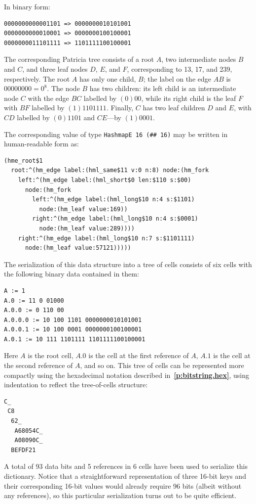 \documentclass[12pt,oneside]{article}
\def\refpoint#1{{\rm\textbf{\ref{#1}}}}
\let\ptref=\refpoint
\begin{document}
In binary form:
\begin{verbatim}
0000000000001101 => 0000000010101001
0000000000010001 => 0000000100100001
0000000011101111 => 1101111100100001
\end{verbatim}

The corresponding Patricia tree consists of a root $A$, two intermediate nodes $B$ and $C$, and three leaf nodes $D$, $E$, and $F$, corresponding to 13, 17, and 239, respectively. The root $A$ has only one child, $B$; the label on the edge $AB$ is $00000000=0^8$. The node $B$ has two children: its left child is an intermediate node $C$ with the edge $BC$ labelled by $(0)00$, while its right child is the leaf $F$ with $BF$ labelled by $(1)1101111$. Finally, $C$ has two leaf children $D$ and $E$, with $CD$ labelled by $(0)1101$ and $CE$---by $(1)0001$.

The corresponding value of type {\tt HashmapE 16 (\#\# 16)} may be written in human-readable form as:
\begin{verbatim}
(hme_root$1
  root:^(hm_edge label:(hml_same$11 v:0 n:8) node:(hm_fork
    left:^(hm_edge label:(hml_short$0 len:$110 s:$00)
      node:(hm_fork
        left:^(hm_edge label:(hml_long$10 n:4 s:$1101)
          node:(hm_leaf value:169))
        right:^(hm_edge label:(hml_long$10 n:4 s:$0001)
          node:(hm_leaf value:289))))
    right:^(hm_edge label:(hml_long$10 n:7 s:$1101111)
      node:(hm_leaf value:57121)))))
\end{verbatim}

The serialization of this data structure into a tree of cells consists of six cells with the following binary data contained in them:
\begin{verbatim}
A := 1
A.0 := 11 0 01000
A.0.0 := 0 110 00
A.0.0.0 := 10 100 1101 0000000010101001
A.0.0.1 := 10 100 0001 0000000100100001
A.0.1 := 10 111 1101111 1101111100100001
\end{verbatim}
Here $A$ is the root cell, $A.0$ is the cell at the first reference of $A$, $A.1$ is the cell at the second reference of $A$, and so on. This tree of cells can be represented more compactly using the hexadecimal notation described in~\ptref{p:bitstring.hex}, using indentation to reflect the tree-of-cells structure:
\begin{verbatim}
C_
 C8
  62_
   A68054C_
   A08090C_
  BEFDF21
\end{verbatim}
A total of 93 data bits and 5 references in 6 cells have been used to serialize this dictionary. Notice that a straightforward representation of three 16-bit keys and their corresponding 16-bit values would already require 96 bits (albeit without any references), so this particular serialization turns out to be quite efficient.
\end{document}
